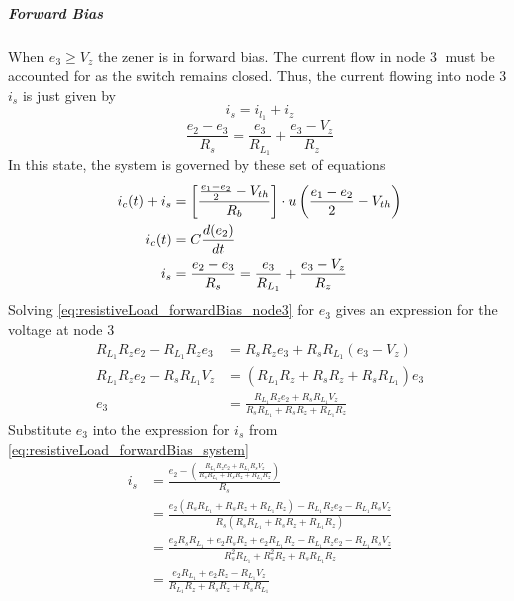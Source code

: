 \subparagraph{Forward Bias}
When $e_3 \geq V_z$ the zener is in forward bias. The current flow in node \textcircled{3} must be accounted for as the switch remains closed. Thus, the current flowing into node \textcircled{3} $i_s$ is just given by $$i_s = i_{l_1} + i_z$$
\begin{equation}
	\frac{e_2-e_3}{R_s}=\frac{e_3}{R_{L_1}} + \frac{e_3 - V_z}{R_z}
	\label{eq:resistiveLoad_forwardBias_node3}
\end{equation}
In this state, the system is governed by these set of equations
\begin{equation}
	\begin{split}
    	i_c(t) + i_s &= \left[\frac{\frac{e_1 - e_2}{2} - V_{th}}{R_b} \right]\cdot u\left(\frac{e_1 - e_2}{2} - V_{th} \right)\\
    	i_c(t)&=C\frac{d(e_2)}{dt}\\
    	i_s&=\frac{e_2-e_3}{R_s}=\frac{e_3}{R_{L_1}} + \frac{e_3 - V_z}{R_z}
	\end{split}
	    \label{eq:resistiveLoad_forwardBias_system}
\end{equation}
Solving \eqref{eq:resistiveLoad_forwardBias_node3} for $e_3$ gives an expression for the voltage at node \textcircled{3}
\begin{equation}
\begin{split}
R_{L_1} R_z e_2 - R_{L_1} R_z e_3 &= R_s R_z e_3 + R_s R_{L_1} (e_3 - V_z) \\
R_{L_1} R_z e_2 - R_s R_{L_1} V_z &= (R_{L_1} R_z + R_s R_z + R_s R_{L_1}) e_3 \\
e_3 &= \frac{R_{L_1} R_z e_2 + R_s R_{L_1} V_z}{R_s R_{L_1} + R_s R_z + R_{L_1} R_z}
\end{split}
\end{equation}
Substitute $e_3$ into the expression for $i_s$ from \eqref{eq:resistiveLoad_forwardBias_system}
\begin{equation}
\begin{split}
i_s &= \frac{e_2 - \left(\frac{R_{L_1}R_z e_2 + R_{L_1}R_s V_z}{R_s R_{L_1} + R_s R_z + R_{L_1} R_z}\right)}{R_s} \\
&= \frac{e_2 (R_s R_{L_1} + R_s R_z + R_{L_1} R_z) - R_{L_1}R_z e_2 - R_{L_1}R_s V_z}{R_s (R_s R_{L_1} + R_s R_z + R_{L_1} R_z)} \\
&= \frac{e_2 R_s R_{L_1} + e_2 R_s R_z + e_2 R_{L_1} R_z - R_{L_1}R_z e_2 - R_{L_1}R_s V_z}{R_s^2 R_{L_1} + R_s^2 R_z + R_s R_{L_1} R_z} \\
&= \frac{e_2 R_{L_1} + e_2 R_z - R_{L_1} V_z}{R_{L_1} R_z + R_s R_z + R_s R_{L_1}}
\end{split}
\end{equation}
